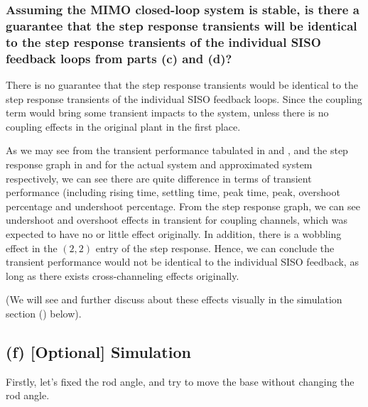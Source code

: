\documentclass{tron}
\begin{document}
\subsubsection{Assuming the MIMO closed-loop system is stable, is there a guarantee that the step response transients will be identical to the step response transients of the individual SISO feedback loops from parts (c) and (d)?}
There is no guarantee that the step response transients would be identical to the step response transients of the individual SISO feedback loops. Since the coupling term would bring some transient impacts to the system, unless there is no coupling effects in the original plant in the first place. 

As we may see from the transient performance tabulated in  and , and the step response graph in  and  for the actual system and approximated system respectively, we can see there are quite difference in terms of transient performance (including rising time, settling time, peak time, peak, overshoot percentage and undershoot percentage. From the step response graph, we can see undershoot and overshoot effects in transient for coupling channels, which was expected to have no or little effect originally. In addition, there is a wobbling effect in the $(2,2)$ entry of the step response. Hence, we can conclude the transient performance would not be identical to the individual SISO feedback, as long as there exists cross-channeling effects originally. 

(We will see and further discuss about these effects visually in the simulation section () below).

\clearpage
\subsection{(f) [Optional] Simulation \label{ans:P5-f}}
Firstly, let's fixed the rod angle, and try to move the base without changing the rod angle.
\end{document}
